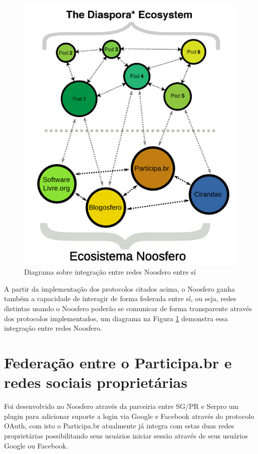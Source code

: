 \documentclass[12pt]{article}
\begin{document}
\begin{figure}[h!]
\center
\includegraphics[scale=0.4]{ecosistema-noosfero-diaspora-v2.png}
\caption{Diagrama sobre integração entre redes Noosfero entre sí}
\label{ecosistema-v2}
\end{figure}

A partir da implementação dos protocolos citados acima, o Noosfero ganha
também a capacidade de interagir de forma federada entre sí, ou seja, redes
distintas usando o Noosfero poderão se comunicar de forma transparente através
dos protocolos implementados, um diagrama na Figura \ref{ecosistema-v2}
demonstra essa integração entre redes Noosfero.

\section{Federação entre o Participa.br e redes sociais proprietárias}

Foi desenvolvido no Noosfero através da parceiria entre SG/PR e Serpro um
plugin para adicionar suporte a login via Google e Facebook através do
protocolo OAuth, com isto o Participa.br atualmente já integra com estas duas
redes proprietárias possibilitando seus usuários iniciar sessão através de
seus usuários Google ou Facebook.
\end{document}
